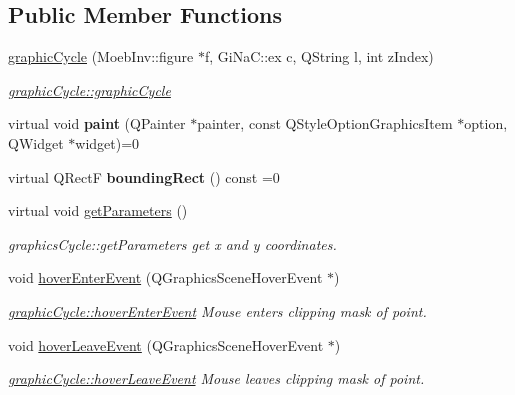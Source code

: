 \subsection*{Public Member Functions}
\begin{DoxyCompactItemize}
\item 
\mbox{\hyperlink{classgraphic_cycle_a3997b985511911703829cd0009917585}{graphic\+Cycle}} (Moeb\+Inv\+::figure $\ast$f, Gi\+Na\+C\+::ex c, Q\+String l, int z\+Index)
\begin{DoxyCompactList}\small\item\em \mbox{\hyperlink{classgraphic_cycle_a3997b985511911703829cd0009917585}{graphic\+Cycle\+::graphic\+Cycle}} \end{DoxyCompactList}\item 
\mbox{\label{classgraphic_cycle_a5ee6c7cc7408b1b6bfb8185b58d2f863}} 
virtual void {\bfseries paint} (Q\+Painter $\ast$painter, const Q\+Style\+Option\+Graphics\+Item $\ast$option, Q\+Widget $\ast$widget)=0
\item 
\mbox{\label{classgraphic_cycle_ac082cbadcf281a5356b40eff26b006f0}} 
virtual Q\+RectF {\bfseries bounding\+Rect} () const =0
\item 
virtual void \mbox{\hyperlink{classgraphic_cycle_ac589011ca82a6c2ab648ed4b9fb1632f}{get\+Parameters}} ()
\begin{DoxyCompactList}\small\item\em graphics\+Cycle\+::get\+Parameters get x and y coordinates. \end{DoxyCompactList}\item 
void \mbox{\hyperlink{classgraphic_cycle_a8ca1f30ff1886a901041d890ba7a97fc}{hover\+Enter\+Event}} (Q\+Graphics\+Scene\+Hover\+Event $\ast$)
\begin{DoxyCompactList}\small\item\em \mbox{\hyperlink{classgraphic_cycle_a8ca1f30ff1886a901041d890ba7a97fc}{graphic\+Cycle\+::hover\+Enter\+Event}} Mouse enters clipping mask of point. \end{DoxyCompactList}\item 
void \mbox{\hyperlink{classgraphic_cycle_aa9aee0ce2a2448da8fd54766c086ec9a}{hover\+Leave\+Event}} (Q\+Graphics\+Scene\+Hover\+Event $\ast$)
\begin{DoxyCompactList}\small\item\em \mbox{\hyperlink{classgraphic_cycle_aa9aee0ce2a2448da8fd54766c086ec9a}{graphic\+Cycle\+::hover\+Leave\+Event}} Mouse leaves clipping mask of point. \end{DoxyCompactList}\item 

\end{DoxyCompactItemize}

